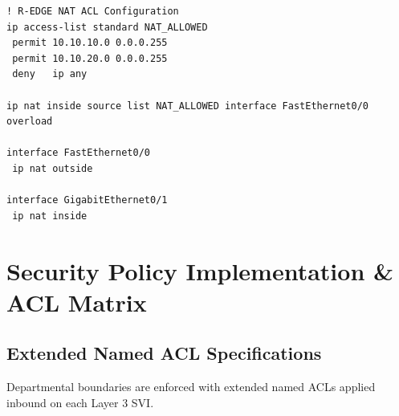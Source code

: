 \documentclass[11pt,a4paper]{article}
\newcommand{\hr}{\vspace{0.2cm}\noindent\hrulefill\vspace{0.2cm}}
\begin{document}
\begin{lstlisting}[style=ciscostyle, caption={R-EDGE NAT ACL Configuration}]
! R-EDGE NAT ACL Configuration
ip access-list standard NAT_ALLOWED
 permit 10.10.10.0 0.0.0.255
 permit 10.10.20.0 0.0.0.255
 deny   ip any

ip nat inside source list NAT_ALLOWED interface FastEthernet0/0 overload

interface FastEthernet0/0
 ip nat outside

interface GigabitEthernet0/1
 ip nat inside
\end{lstlisting}

\hr

\section{Security Policy Implementation \& ACL Matrix}

\subsection{Extended Named ACL Specifications}

Departmental boundaries are enforced with extended named ACLs applied inbound on each Layer 3 SVI.
\end{document}

